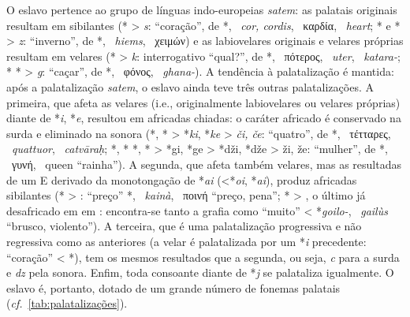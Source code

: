 O eslavo pertence ao grupo de línguas indo-europeias \emph{satem}: as palatais
originais resultam em sibilantes (* > \emph{s}:
 ``coração'', de *,
~\emph{cor, cordis}, ~καρδία,
~\emph{heart}; * e * > \emph{z}:
 ``inverno'', de *,
~\emph{hiems}, ~χειμών) e as labiovelares
originais e velares próprias resultam em velares (* > \emph{k}:
interrogativo  ``qual?'', de *,
~πότερος, ~\emph{uter},
~\emph{katara-}; * * >
\emph{g}:  ``caçar'', de *,
~φόνος, ~\emph{ghana-}).
A tendência à palatalização é mantida: após a palatalização \emph{satem}, o
eslavo ainda teve três outras palatalizações.
A primeira, que afeta as velares (i.e., originalmente labiovelares ou velares
próprias) diante de *\emph{i}, *\emph{e}, resultou em africadas chiadas: o
caráter africado é conservado na surda e eliminado na sonora (*,
* > *\emph{ki}, *\emph{ke} > \emph{či, če}:
 ``quatro'', de *,
~τέτταρες, ~\emph{quattuor},
~\emph{catvāraḥ}; *, *
*, * > *gi, *ge > *dži, *dže > ži, že:
 ``mulher'', de *, ~γυνή,
~queen ``rainha'').
A segunda, que afeta também velares, mas as resultadas de um E derivado da
monotongação de *\emph{ai} (<*\emph{oi}, *\emph{ai}), produz africadas
sibilantes (* > :  ``preço''
*, ~\emph{kainà},
~ποινή ``preço, pena''; * > , o último
já desafricado em  em : encontra-se tanto a grafia
 como  ``muito'' < *\emph{goilo-},
~\emph{gailùs} ``brusco, violento'').
A terceira, que é uma palatalização progressiva e não regressiva como as
anteriores (a velar é palatalizada por um *\emph{i} precedente:
 ``coração'' < *), tem os mesmos
resultados que a segunda, ou seja, \emph{c} para a surda e \emph{dz} pela
sonora.
Enfim, toda consoante diante de *\emph{j} se palataliza igualmente.
O eslavo é, portanto, dotado de um grande número de fonemas palatais
(\emph{cf.}~\autoref{tab:palatalizações}).


